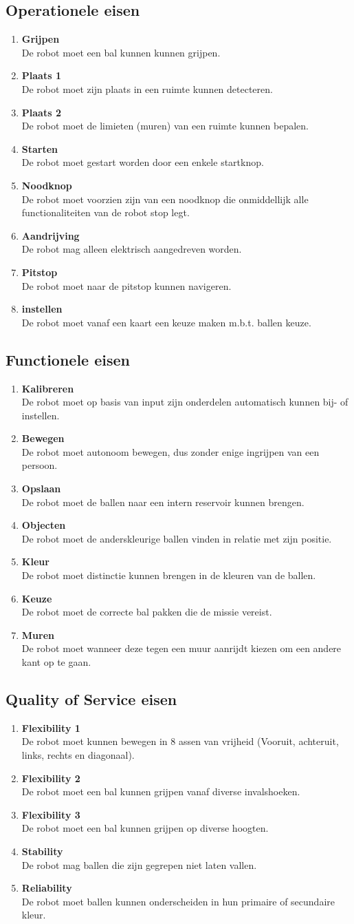 \documentclass[12pt]{article} %
\begin{document}
\subsection{Operationele eisen}

\newcommand\litem[1]{\item{\bfseries #1\\}}
\begin{enumerate}
\litem{Grijpen} De robot moet een bal kunnen kunnen grijpen.
\litem{Plaats 1} De robot moet zijn plaats in een ruimte kunnen detecteren.
\litem{Plaats 2} De robot moet de limieten (muren) van een ruimte kunnen bepalen.
\litem{Starten} De robot moet gestart worden door een enkele startknop.
\litem{Noodknop} De robot moet voorzien zijn van een noodknop die onmiddellijk alle functionaliteiten van de robot stop legt.
\litem{Aandrijving} De robot mag alleen elektrisch aangedreven worden.
\litem{Pitstop} De robot moet naar de pitstop kunnen navigeren.
\litem{instellen} De robot moet vanaf een kaart een keuze maken m.b.t. ballen keuze.
\end{enumerate}

\subsection{Functionele eisen}
\begin{enumerate}
\litem{Kalibreren} De robot moet op basis van input zijn onderdelen automatisch kunnen bij- of instellen.
\litem{Bewegen} De robot moet autonoom bewegen, dus zonder enige ingrijpen van een persoon.
\litem{Opslaan} De robot moet de ballen naar een intern reservoir kunnen brengen.
\litem{Objecten} De robot moet de anderskleurige ballen vinden in relatie met zijn positie.
\litem{Kleur} De robot moet distinctie kunnen brengen in de kleuren van de ballen. 
\litem{Keuze} De robot moet de correcte bal pakken die de missie vereist.
\litem{Muren} De robot moet wanneer deze tegen een muur aanrijdt kiezen om een andere kant op te gaan.
\end{enumerate}
\newpage

\subsection{Quality of Service eisen}
\begin{enumerate}
\litem{Flexibility 1} De robot moet kunnen bewegen in 8 assen van vrijheid (Vooruit, achteruit, links, rechts en diagonaal).
\litem{Flexibility 2} De robot moet een bal kunnen grijpen vanaf diverse invalshoeken.
\litem{Flexibility 3} De robot moet een bal kunnen grijpen op diverse hoogten.
\litem{Stability} De robot mag ballen die zijn gegrepen niet laten vallen.
\litem{Reliability} De robot moet ballen kunnen onderscheiden in hun primaire of secundaire kleur.
\end{enumerate}
\end{document}
